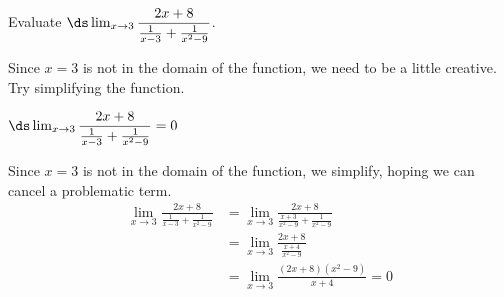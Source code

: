 \begin{question}
Evaluate $\ds\lim_{x \to 3}\dfrac{2x+8}{\frac{1}{x-3}+\frac{1}{x^2-9}}$.
\end{question}
\begin{hint}
Since $x=3$ is not in the domain of the function, we need to be a little creative. Try simplifying the function.
\end{hint}
\begin{answer}
$\ds\lim_{x \to 3}\dfrac{2x+8}{\frac{1}{x-3}+\frac{1}{x^2-9}}=0$
\end{answer}
\begin{solution}

Since $x=3$ is not in the domain of the function, we simplify, hoping we can cancel a problematic term.
\begin{align*}
\lim_{x \to 3}\frac{2x+8}{\frac{1}{x-3}+\frac{1}{x^2-9}}&=\lim_{x \to 3}\frac{2x+8}{\frac{x+3}{x^2-9}+\frac{1}{x^2-9}}\\
&=\lim_{x \to 3}\frac{2x+8}{\frac{x+4}{x^2-9}}\\
&=\lim_{x \to 3}\frac{(2x+8)(x^2-9)}{x+4}=0
\end{align*}

\end{solution}



\subsection*{\Application}

